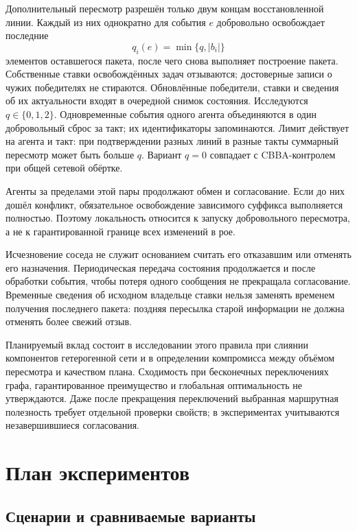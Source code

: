\documentclass{misisarticle}
\begin{document}
Дополнительный пересмотр разрешён только двум концам восстановленной линии. Каждый из них однократно для события $e$ добровольно освобождает последние
\begin{equation}
 q_i(e)=\min\{q,|b_i|\}
\end{equation}
элементов оставшегося пакета, после чего снова выполняет построение пакета. Собственные ставки освобождённых задач отзываются; достоверные записи о чужих победителях не стираются. Обновлённые победители, ставки и сведения об их актуальности входят в очередной снимок состояния. Исследуются $q\in\{0,1,2\}$. Одновременные события одного агента объединяются в один добровольный сброс за такт; их идентификаторы запоминаются. Лимит действует на агента и такт: при подтверждении разных линий в разные такты суммарный пересмотр может быть больше $q$. Вариант $q=0$ совпадает с CBBA-контролем при общей сетевой обёртке.

Агенты за пределами этой пары продолжают обмен и согласование. Если до них дошёл конфликт, обязательное освобождение зависимого суффикса выполняется полностью. Поэтому локальность относится к запуску добровольного пересмотра, а не к гарантированной границе всех изменений в рое.

Исчезновение соседа не служит основанием считать его отказавшим или отменять его назначения. Периодическая передача состояния продолжается и после обработки события, чтобы потеря одного сообщения не прекращала согласование. Временные сведения об исходном владельце ставки нельзя заменять временем получения последнего пакета: поздняя пересылка старой информации не должна отменять более свежий отзыв.

Планируемый вклад состоит в исследовании этого правила при слиянии компонентов гетерогенной сети и в определении компромисса между объёмом пересмотра и качеством плана. Сходимость при бесконечных переключениях графа, гарантированное преимущество и глобальная оптимальность не утверждаются. Даже после прекращения переключений выбранная маршрутная полезность требует отдельной проверки свойств; в экспериментах учитываются незавершившиеся согласования.

\section{План экспериментов}

\subsection{Сценарии и сравниваемые варианты}
\end{document}
